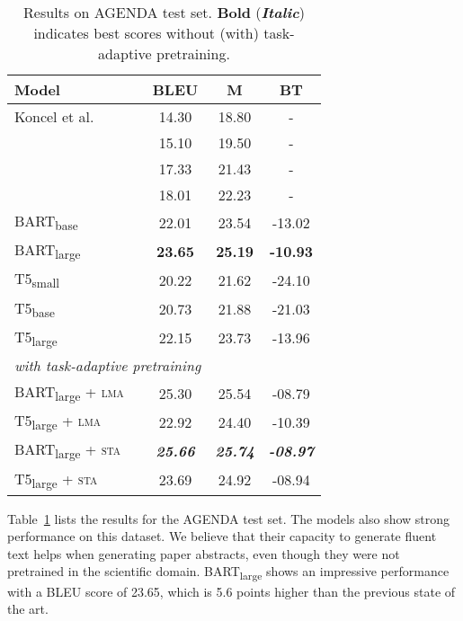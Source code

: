 \documentclass[11pt]{article}
\begin{document}
\begin{table}[t]
\centering
{\renewcommand{\arraystretch}{0.9}
\begin{tabular}{@{\hspace*{1mm}}lccc@{\hspace*{1mm}}}  
\toprule
\textbf{Model} & \textbf{BLEU} & \textbf{M} & \textbf{BT}  \\
\midrule
Koncel et al. \citeyear{koncel-kedziorski-etal-2019-text}  & 14.30 & 18.80 & - \\
\citet{An2019RepulsiveBS} & 15.10 & 19.50 & -\\
\citet{schmitt2020modeling} & 17.33 & 21.43  & -\\
\citet{ribeiro-etal-2020-modeling} & 18.01 & 22.23 & -\\
\midrule
BART\textsubscript{base} & 22.01 & 23.54 & -13.02 \\
BART\textsubscript{large} & \textbf{23.65} & \textbf{25.19} & \textbf{-10.93} \\
T5\textsubscript{small} & 20.22 & 21.62 & -24.10 \\
T5\textsubscript{base} & 20.73 & 21.88 & -21.03 \\
T5\textsubscript{large} & 22.15 & 23.73 & -13.96 \\
\midrule
\multicolumn{2}{l}{\small{\textit{with task-adaptive pretraining}}} & & \\[.2em]
BART\textsubscript{large} + \textsc{lma} & 25.30 & 25.54 & -08.79 \\
T5\textsubscript{large} + \textsc{lma} & 22.92  & 24.40 & -10.39 \\[.7em]
BART\textsubscript{large} + \textsc{sta} & \textbf{\textit{25.66}} & \textbf{\textit{25.74}} & \textbf{\textit{-08.97}} \\
T5\textsubscript{large} + \textsc{sta} & 23.69 & 24.92 & -08.94 \\
\bottomrule
\end{tabular}}
\caption{Results on AGENDA test set. \textbf{Bold} (\textbf{\textit{Italic}}) indicates best scores without (with) task-adaptive pretraining.}
\label{tab:results-agenda}
\vspace{-0.4cm}
\end{table}

Table~\ref{tab:results-agenda} lists the results for the AGENDA test set. The models also show strong performance on this dataset. We believe that their capacity to generate fluent text helps when generating paper abstracts, even though they were not pretrained in the scientific domain. BART\textsubscript{large} shows an impressive performance with a BLEU score of 23.65, which is 5.6 points higher than the previous state of the art.
\end{document}
